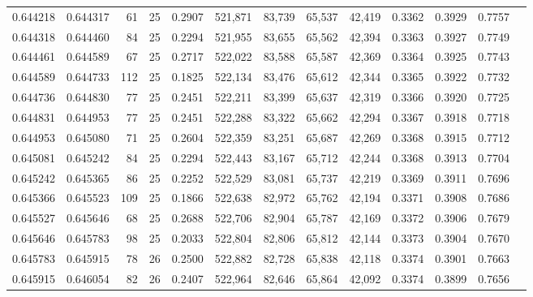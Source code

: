 \begin{tabular}{rrrrrrrrrrrrr}
0.644218 & 0.644317 &    61 &  25 &                                     0.2907 & 521,871 &  83,739 &  65,537 &  42,419 & 0.3362 & 0.3929 & 0.7757 \\
0.644318 & 0.644460 &    84 &  25 &                                     0.2294 & 521,955 &  83,655 &  65,562 &  42,394 & 0.3363 & 0.3927 & 0.7749 \\
0.644461 & 0.644589 &    67 &  25 &                                     0.2717 & 522,022 &  83,588 &  65,587 &  42,369 & 0.3364 & 0.3925 & 0.7743 \\
0.644589 & 0.644733 &   112 &  25 &                                     0.1825 & 522,134 &  83,476 &  65,612 &  42,344 & 0.3365 & 0.3922 & 0.7732 \\
0.644736 & 0.644830 &    77 &  25 &                                     0.2451 & 522,211 &  83,399 &  65,637 &  42,319 & 0.3366 & 0.3920 & 0.7725 \\
0.644831 & 0.644953 &    77 &  25 &                                     0.2451 & 522,288 &  83,322 &  65,662 &  42,294 & 0.3367 & 0.3918 & 0.7718 \\
0.644953 & 0.645080 &    71 &  25 &                                     0.2604 & 522,359 &  83,251 &  65,687 &  42,269 & 0.3368 & 0.3915 & 0.7712 \\
0.645081 & 0.645242 &    84 &  25 &                                     0.2294 & 522,443 &  83,167 &  65,712 &  42,244 & 0.3368 & 0.3913 & 0.7704 \\
0.645242 & 0.645365 &    86 &  25 &                                     0.2252 & 522,529 &  83,081 &  65,737 &  42,219 & 0.3369 & 0.3911 & 0.7696 \\
0.645366 & 0.645523 &   109 &  25 &                                     0.1866 & 522,638 &  82,972 &  65,762 &  42,194 & 0.3371 & 0.3908 & 0.7686 \\
0.645527 & 0.645646 &    68 &  25 &                                     0.2688 & 522,706 &  82,904 &  65,787 &  42,169 & 0.3372 & 0.3906 & 0.7679 \\
0.645646 & 0.645783 &    98 &  25 &                                     0.2033 & 522,804 &  82,806 &  65,812 &  42,144 & 0.3373 & 0.3904 & 0.7670 \\
0.645783 & 0.645915 &    78 &  26 &                                     0.2500 & 522,882 &  82,728 &  65,838 &  42,118 & 0.3374 & 0.3901 & 0.7663 \\
0.645915 & 0.646054 &    82 &  26 &                                     0.2407 & 522,964 &  82,646 &  65,864 &  42,092 & 0.3374 & 0.3899 & 0.7656 \\

\end{tabular}
